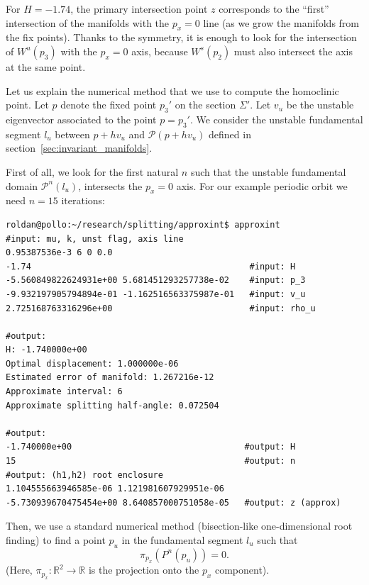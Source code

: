 \documentclass[a4paper]{amsart}
\theoremstyle{remark}
\newcommand{\sixmap}{\mathcal{P}}
\newcommand{\field}[1]{\mathbb{#1}}
\begin{document}
For $H=-1.74$, the primary intersection point $z$ corresponds to the
``first'' intersection of the manifolds with the $p_x=0$ line (as we
grow the manifolds from the fix points).
Thanks to the symmetry, it is enough to look for the intersection of
$W^u(p_3)$ with the $p_x=0$ axis, because $W^s(p_2)$ must also
intersect the axis at the same point.

Let us explain the numerical method that we use to compute the
homoclinic point.
Let $p$ denote the fixed point $p_3'$ on the section $\Sigma'$.
Let $v_u$ be the unstable eigenvector associated to the point $p=p_3'$.
We consider the unstable fundamental segment $l_u$ between $p+hv_u$ and
$\sixmap(p+hv_u)$ defined in section~\ref{sec:invariant_manifolds}.

First of all, we look for the first natural $n$ such that the unstable
fundamental domain $\sixmap^n(l_u)$, intersects the $p_x=0$ axis.
For our example periodic orbit we need $n=15$ iterations:

\begin{verbatim}
roldan@pollo:~/research/splitting/approxint$ approxint
#input: mu, k, unst flag, axis line
0.95387536e-3 6 0 0.0        
-1.74                                           #input: H
-5.560849822624931e+00 5.681451293257738e-02    #input: p_3
-9.932197905794894e-01 -1.162516563375987e-01   #input: v_u
2.725168763316296e+00                           #input: rho_u

#output:
H: -1.740000e+00
Optimal displacement: 1.000000e-06
Estimated error of manifold: 1.267216e-12
Approximate interval: 6
Approximate splitting half-angle: 0.072504

#output:
-1.740000e+00                                  #output: H
15                                             #output: n
#output: (h1,h2) root enclosure
1.104555663946585e-06 1.121981607929951e-06    
-5.730939670475454e+00 8.640857000751058e-05   #output: z (approx)
\end{verbatim}

Then, we use a standard numerical method (bisection-like
one-dimensional root finding) to find a point $p_u$ in the fundamental
segment $l_u$ such that 
\[ \pi_{p_x}(P^{n}(p_u))=0. \] 
(Here, $\pi_{p_x}\colon \field{R}^2\to \field{R}$ is the projection onto the
$p_x$ component).
\end{document}
